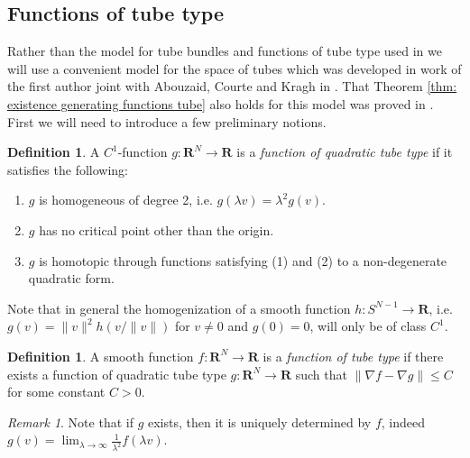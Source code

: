 \documentclass{amsart}
\def\bR{\mathbf{R}}
\theoremstyle{definition}
\newtheorem{definition}[theorem]{Definition}
\theoremstyle{remark}
\newtheorem{inductive lemma}[theorem]{Inductive Lemma}
\newtheorem{remark}[theorem]{Remark}
\begin{document}
\subsection{Functions of tube type}\label{sec: tube bundles}

Rather than the model for tube bundles and functions of tube type used in \cite{ACGK} we  will use a convenient model for the space of tubes which was developed in work of the first author joint with Abouzaid, Courte and Kragh in \cite{AACK}. That Theorem \ref{thm: existence generating functions tube} also holds for this model was proved in \cite{AACK}. First we will need to introduce a few preliminary notions. 

\begin{definition}\label{def: quad tube}
A $C^1$-function $g:\bR^N \to \bR$ is a {\em{function of quadratic tube type}} if it satisfies the following:
\begin{enumerate}
\item $g$ is homogeneous of degree 2, i.e. $g(\lambda v) = \lambda^2 g(v)$.
\item $g$ has no critical point other than the origin.
\item $g$ is homotopic through functions satisfying (1) and (2) to a non-degenerate quadratic form. 
\end{enumerate}
\end{definition}

Note that in general the homogenization of a smooth function $h:S^{N-1} \to \bR$, i.e. $g(v)=\|v\|^2h(v/\|v\|)$ for $v \neq 0$ and $g(0)=0$, will only be of class $C^1$. 

\begin{definition}\label{def: tube}
A smooth function $f:\bR^N \to \bR$ is a {\em function of tube type} if there exists a function of quadratic tube type $g:\bR^N \to \bR$ such that $\| \nabla f - \nabla g \| \leq C$ for some constant $C>0$.
\end{definition}

\begin{remark} Note that if $g$ exists, then it is uniquely determined by $f$, indeed $g(v) = \lim_{\lambda \to \infty}  \frac{1}{\lambda^2}f(\lambda v)$. \end{remark}
\end{document}
